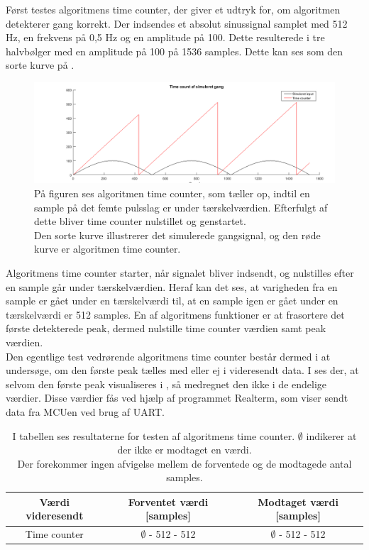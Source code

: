 Først testes algoritmens time counter, der giver et udtryk for, om algoritmen detekterer gang korrekt. Der indsendes et absolut sinussignal samplet med 512 Hz, en frekvens på 0,5 Hz og en amplitude på 100. Dette resulterede i tre halvbølger med en amplitude på 100 på 1536 samples. Dette kan ses som den sorte kurve på .
\begin{figure}[H]
	\centering
	\includegraphics[width=.9\textwidth]{figures/cDesign/test_timecount_gang.png}
	\caption{På figuren ses algoritmen time counter, som tæller op, indtil en sample på det femte pulsslag er under tærskelværdien. Efterfulgt af dette bliver time counter nulstillet og genstartet. \\
Den sorte kurve illustrerer det simulerede gangsignal, og den røde kurve er algoritmen time counter.}
	\label{fig:testgraf_timecounter}
\end{figure}
Algoritmens time counter starter, når signalet bliver indsendt, og nulstilles efter en sample går under tærskelværdien. Heraf kan det ses, at varigheden fra en sample er gået under en tærskelværdi til, at en sample igen er gået under en tærskelværdi er 512 samples. En af algoritmens funktioner er at frasortere det første detekterede peak, dermed nulstille time counter værdien samt peak værdien.\\
Den egentlige test vedrørende algoritmens time counter består dermed i at undersøge, om den første peak tælles med eller ej i videresendt data. I  ses der, at selvom den første peak visualiseres i , så medregnet den ikke i de endelige værdier. Disse værdier fås ved hjælp af programmet Realterm, som viser sendt data fra MCUen ved brug af UART.
\begin{table}[H]
	\centering
	\begin{tabular}{ccc}
		\hline
		\rowcolor[HTML]{C0C0C0} 
		Værdi videresendt & Forventet værdi [samples] & Modtaget værdi [samples] \\ \hline
		Time counter & $\emptyset$ - 512 - 512 & $\emptyset$ - 512 - 512 \\ \hline
	\end{tabular}
	\caption{I tabellen ses resultaterne for testen af algoritmens time counter. $\emptyset$ indikerer at der ikke er modtaget en værdi.\\
	Der forekommer ingen afvigelse mellem de forventede og de modtagede antal samples.}
	\label{tab:test_res_timecount}
\end{table} \vspace{-0.5cm}
